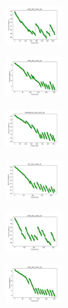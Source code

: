 \begin{figure}[H]
\begin{subfigure}
        \centering
        \includegraphics[width=0.234\textwidth]{img/ils/ecoli_set_const_10_589741062_cost.png}
    \end{subfigure}
    \hfill
    \begin{subfigure}
        \centering
        \includegraphics[width=0.234\textwidth]{img/ils/rand_set_const_10_589741062_cost.png}
    \end{subfigure}
    \hfill
    \begin{subfigure}
        \centering
        \includegraphics[width=0.234\textwidth]{img/ils/newthyroid_set_const_10_589741062_cost.png}
    \end{subfigure}
    \hfill
    \begin{subfigure}
        \centering
        \includegraphics[width=0.234\textwidth]{img/ils/iris_set_const_10_277451237_cost.png}
    \end{subfigure}
    \hfill
    \begin{subfigure}
        \centering
        \includegraphics[width=0.234\textwidth]{img/ils/ecoli_set_const_10_277451237_cost.png}
    \end{subfigure}
    \hfill
    \begin{subfigure}
        \centering
        \includegraphics[width=0.234\textwidth]{img/ils/rand_set_const_10_277451237_cost.png}

\end{subfigure}
\end{figure}

